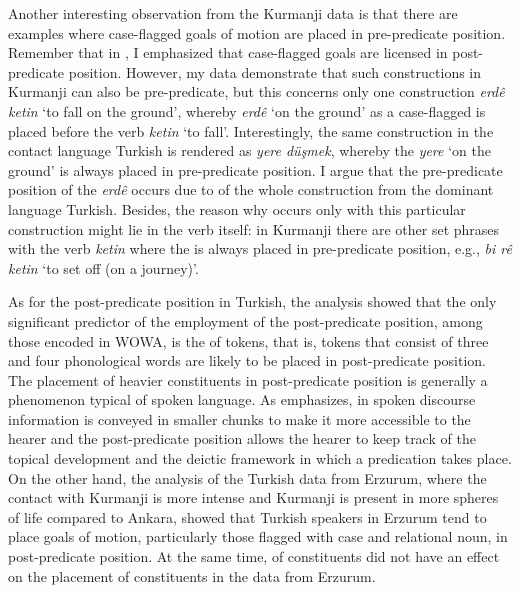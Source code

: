\documentclass[output=paper,colorlinks,citecolor=brown]{langscibook}
\begin{document}
Another interesting observation from the Kurmanji data is that there are examples where case-flagged goals of motion are placed in pre-predicate position. Remember that in , I emphasized that case-flagged goals are licensed in post-predicate position. However, my data demonstrate that such constructions in Kurmanji can also be pre-predicate, but this concerns only one construction \textit{erdê ketin} `to fall on the ground', whereby \textit{erdê} `on the ground' as a case-flagged   is placed before the verb \textit{ketin} `to fall'. Interestingly, the same construction in the contact language Turkish is rendered as \textit{yere düşmek}, whereby the   \textit{yere} `on the ground' is always placed in pre-predicate position. I argue that the pre-predicate position of the  \textit{erdê} occurs due to  of the whole construction from the dominant language Turkish. Besides, the reason why  occurs only with this particular construction might lie in the verb itself: in Kurmanji there are other set phrases with the verb \textit{ketin} where the  is always placed in pre-predicate position, e.g., \textit{bi rê ketin} `to set off (on a journey)'.

As for the post-predicate position in Turkish, the analysis showed that the only significant predictor of the employment of the post-predicate position, among those encoded in WOWA, is the  of tokens, that is, tokens that consist of three and four phonological words are likely to be placed in post-predicate position. The placement of heavier constituents in post-predicate position is generally a phenomenon typical of spoken language. As \citet{schroeder1995postpredicate} emphasizes, in spoken discourse information is conveyed in smaller chunks to make it more accessible to the hearer and the post-predicate position allows the hearer to keep track of the topical development and the deictic framework in which a predication takes place. On the other hand, the analysis of the Turkish data from Erzurum, where the contact with Kurmanji is more intense and Kurmanji is present in more spheres of life compared to Ankara, showed that Turkish speakers in Erzurum tend to place goals of motion, particularly those flagged with case and relational noun, in post-predicate position. At the same time,  of constituents did not have an effect on the placement of constituents in the data from Erzurum. 
\end{document}
